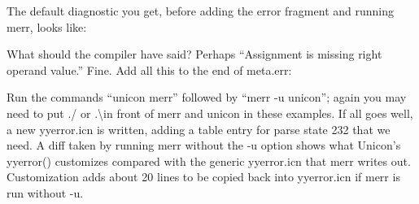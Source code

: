 \documentclass[letterpaper]{article}
\begin{document}
\noindent The default diagnostic you get, before adding the error fragment
and running merr, looks like:


What should the compiler have said?  Perhaps ``Assignment is missing
right operand value.'' Fine.  Add all this to the end of meta.err:


Run the commands ``unicon merr'' followed by ``merr -u unicon''; again
you may need to put ./ or .\textbackslash in front of merr and unicon
in these examples. If all goes
well, a new yyerror.icn is written, adding a table entry for
parse state 232 that we need. A diff taken by running merr without the
-u option shows what Unicon's yyerror() customizes compared with the
generic yyerror.icn that merr writes out.
Customization adds about 20 lines to be copied back into yyerror.icn
if merr is run without -u.
\end{document}
